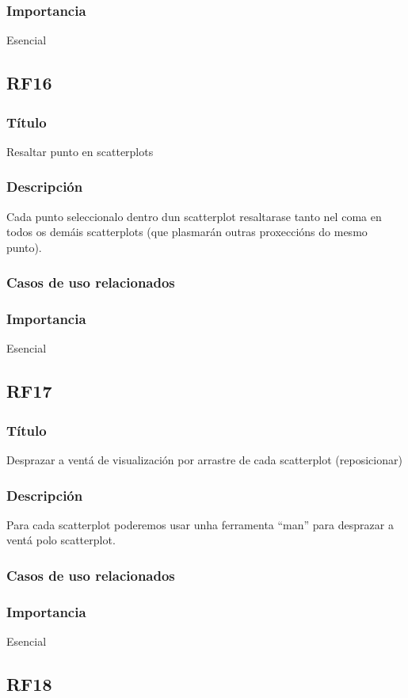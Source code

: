 \subsubsection{Importancia}
Esencial

\subsection*{RF16}
\subsubsection{Título}
Resaltar punto en scatterplots
\subsubsection{Descripción}
Cada punto seleccionalo dentro dun scatterplot resaltarase tanto nel coma en todos os demáis scatterplots (que plasmarán outras proxeccións do mesmo punto).
\subsubsection{Casos de uso relacionados}
\subsubsection{Importancia}
Esencial

\subsection*{RF17}
\subsubsection{Título}
Desprazar a ventá de visualización por arrastre de cada scatterplot (reposicionar)
\subsubsection{Descripción}
Para cada scatterplot poderemos usar unha ferramenta ``man'' para desprazar a ventá polo scatterplot.
\subsubsection{Casos de uso relacionados}
\subsubsection{Importancia}
Esencial

\subsection*{RF18}
